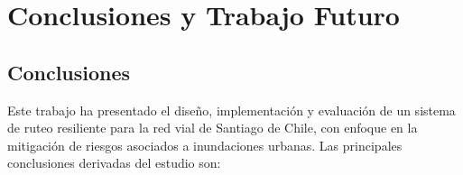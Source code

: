 \documentclass[conference]{IEEEtran}
\begin{document}
\section{Conclusiones y Trabajo Futuro}

\subsection{Conclusiones}

Este trabajo ha presentado el diseño, implementación y evaluación de un sistema de ruteo resiliente para la red vial de Santiago de Chile, con enfoque en la mitigación de riesgos asociados a inundaciones urbanas. Las principales conclusiones derivadas del estudio son:
\end{document}
